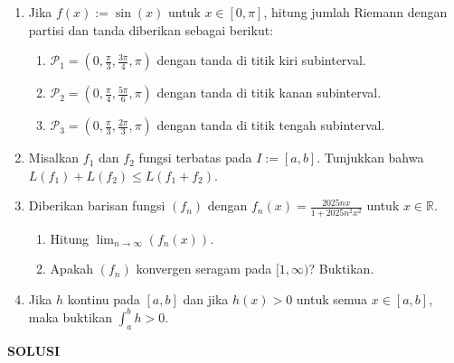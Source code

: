 \documentclass[11pt,letterpaper]{article}
\begin{document}
\begin{enumerate}
  \item Jika $f(x) := \sin(x)$ untuk $x \in [0,\pi]$, hitung jumlah Riemann dengan partisi dan tanda diberikan sebagai berikut:
        \begin{enumerate}[label=\alph*)]
          \item $\mathcal{P}_1 = \left(0, \frac{\pi}{3}, \frac{3\pi}{4}, \pi\right)$ dengan tanda di titik kiri subinterval.
          \item $\mathcal{P}_2 = \left(0, \frac{\pi}{4}, \frac{5\pi}{6}, \pi\right)$ dengan tanda di titik kanan subinterval.
          \item $\mathcal{P}_3 = \left(0, \frac{\pi}{3}, \frac{2\pi}{3}, \pi\right)$ dengan tanda di titik tengah subinterval.
        \end{enumerate}
  \item Misalkan $f_1$ dan $f_2$ fungsi terbatas pada $I := [a,b]$. Tunjukkan bahwa $L(f_1) + L(f_2) \leq L(f_1 + f_2)$.
  \item Diberikan barisan fungsi $(f_n)$ dengan $f_n(x) = \frac{2025nx}{1+2025n^2x^2}$ untuk $x \in \mathbb{R}$.
        \begin{enumerate}[label=\alph*)]
          \item Hitung $\lim_{n \to \infty} (f_n(x))$.
          \item Apakah $(f_n)$ konvergen seragam pada $[1, \infty)$? Buktikan.
        \end{enumerate}
  \item Jika $h$ kontinu pada $[a,b]$ dan jika $h(x) > 0$ untuk semua $x \in [a,b]$, maka buktikan $\int_a^b h > 0$.
\end{enumerate}

\newpage
\begin{center}
  \textbf{SOLUSI}
\end{center}
\end{document}
